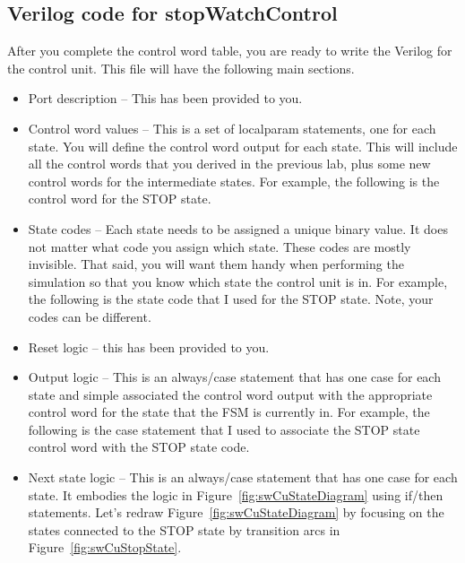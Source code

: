 \subsection{Verilog code for stopWatchControl}
\label{subsubsection:swCuVerilog}
After you complete the control word table, you are ready to write the
Verilog for the control unit. This file will have the following main
sections.

\begin{itemize}
\item
    Port description -- This has been provided to you.
\item
    Control word values -- This is a set of localparam statements, one for
    each state. You will define the control word output for each state.
    This will include all the control words that you derived in the
    previous lab, plus some new control words for the intermediate states.
    For example, the following is the control word for the STOP state.
\end{itemize}


\begin{itemize}
\item
    State codes -- Each state needs to be assigned a unique binary value.
    It does not matter what code you assign which state. These codes are
    mostly invisible. That said, you will want them handy when performing
    the simulation so that you know which state the control unit is in.
    For example, the following is the state code that I used for the STOP
    state. Note, your codes can be different.
\end{itemize}


\begin{itemize}
\item
    Reset logic -- this has been provided to you.
\item
    Output logic -- This is an always/case statement that has one case for
    each state and simple associated the control word output with the
    appropriate control word for the state that the FSM is currently in.
    For example, the following is the case statement that I used to
    associate the STOP state control word with the STOP state code.
\end{itemize}


\begin{itemize}
\item
    Next state logic -- This is an always/case statement that has one case
    for each state. It embodies the logic in Figure~\ref{fig:swCuStateDiagram} using if/then
    statements. Let's redraw Figure~\ref{fig:swCuStateDiagram} by focusing on the states connected
    to the STOP state by transition arcs in Figure~\ref{fig:swCuStopState}.
\end{itemize}

